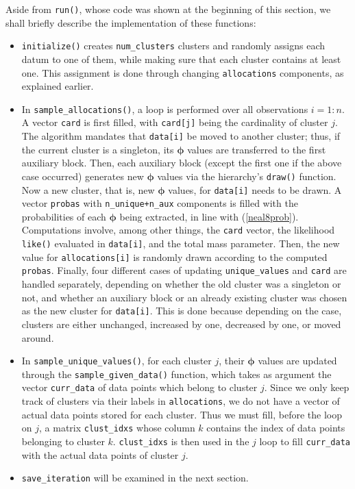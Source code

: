 Aside from \verb|run()|, whose code was shown at the beginning of this section, we shall briefly describe the implementation of these functions:
\begin{itemize}
	\item \verb|initialize()| creates \verb|num_clusters| clusters and randomly assigns each datum to one of them, while making sure that each cluster contains at least one.
	This assignment is done through changing \verb|allocations| components, as explained earlier.
	\item In \verb|sample_allocations()|, a loop is performed over all observations $i=1:n$.
	A vector \verb|card| is first filled, with \verb|card[j]| being the cardinality of cluster $j$.
	The algorithm mandates that \verb|data[i]| be moved to another cluster; thus, if the current cluster is a singleton, its $\boldsymbol\phi$ values are transferred to the first auxiliary block.
	Then, each auxiliary block (except the first one if the above case occurred) generates new $\boldsymbol\phi$ values via the hierarchy's \verb|draw()| function.
	Now a new cluster, that is, new $\boldsymbol\phi$ values, for \verb|data[i]| needs to be drawn.
	A vector \verb|probas| with \verb|n_unique+n_aux| components is filled with the probabilities of each $\boldsymbol\phi$ being extracted, in line with (\ref{neal8prob}).
	Computations involve, among other things, the \verb|card| vector, the likelihood \verb|like()| evaluated in \verb|data[i]|, and the total mass parameter.
	Then, the new value for \verb|allocations[i]| is randomly drawn according to the computed \verb|probas|.
	Finally, four different cases of updating \verb|unique_values| and \verb|card| are handled separately, depending on whether the old cluster was a singleton or not, and whether an auxiliary block or an already existing cluster was chosen as the new cluster for \verb|data[i]|.
	This is done because depending on the case, clusters are either unchanged, increased by one, decreased by one, or moved around.
	\item In \verb|sample_unique_values()|, for each cluster $j$, their $\boldsymbol\phi$ values are updated through the \verb|sample_given_data()| function, which takes as argument the vector \verb|curr_data| of data points which belong to cluster $j$.
	Since we only keep track of clusters via their labels in \verb|allocations|, we do not have a vector of actual data points stored for each cluster.
	Thus we must fill, before the loop on $j$, a matrix \verb|clust_idxs| whose column $k$ contains the index of data points belonging to cluster $k$.
	\verb|clust_idxs| is then used in the $j$ loop to fill \verb|curr_data| with the actual data points of cluster $j$.
	\item \verb|save_iteration| will be examined in the next section.
\end{itemize}

